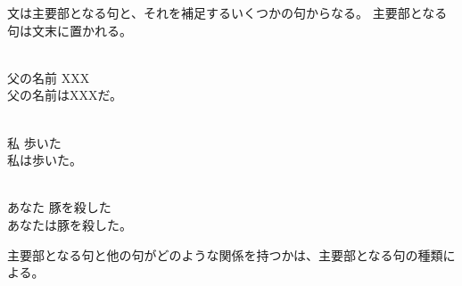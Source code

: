 文は主要部となる句と、それを補足するいくつかの句からなる。
主要部となる句は文末に置かれる。

\begin{exe}
    \ex \gll [u\'ak\'a ap\'a piku\'o] [XXX] \\
    父の名前 XXX \\
    \glt 父の名前はXXXだ。
\end{exe}
\begin{exe}
    \ex \gll [reap\'a] [t\'iv\'o-p\'a] \\
    私 歩いた \\
    \glt 私は歩いた。
\end{exe}
\begin{exe}
    \ex {} \\
    あなた 豚を殺した \\
    \glt あなたは豚を殺した。
\end{exe}

主要部となる句と他の句がどのような関係を持つかは、主要部となる句の種類による。